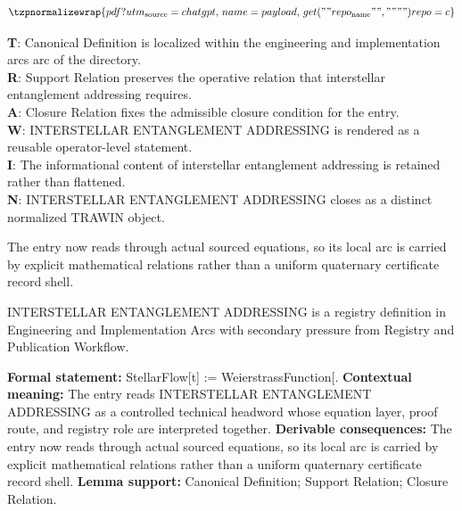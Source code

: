 \begin{minipage}[t]{0.48\linewidth}
\[
\tzpnormalizewrap{pdf?utm_{\mathrm{source}}=chatgpt,\,name = payload,\,get(""repo_{\mathrm{name}}"", """") repo = c}
\]

\small
\textbf{T}: Canonical Definition is localized within the engineering and implementation arcs arc of the directory.\\
\textbf{R}: Support Relation preserves the operative relation that interstellar entanglement addressing requires.\\
\textbf{A}: Closure Relation fixes the admissible closure condition for the entry.\\
\textbf{W}: INTERSTELLAR ENTANGLEMENT ADDRESSING is rendered as a reusable operator-level statement.\\
\textbf{I}: The informational content of interstellar entanglement addressing is retained rather than flattened.\\
\textbf{N}: INTERSTELLAR ENTANGLEMENT ADDRESSING closes as a distinct normalized TRAWIN object.
\normalsize
\end{minipage}

The entry now reads through actual sourced equations, so its local arc is carried by explicit mathematical relations rather than a uniform quaternary certificate record shell.
\clearpage


\begingroup\small
{}
INTERSTELLAR ENTANGLEMENT ADDRESSING is a registry definition in Engineering and Implementation Arcs with secondary pressure from Registry and Publication Workflow.

\begingroup\footnotesize\setlength{\emergencystretch}{3em}\sloppy
\textbf{Formal statement:} StellarFlow[t] := WeierstrassFunction[. \textbf{Contextual meaning:} The entry reads INTERSTELLAR ENTANGLEMENT ADDRESSING as a controlled technical headword whose equation layer, proof route, and registry role are interpreted together. \textbf{Derivable consequences:} The entry now reads through actual sourced equations, so its local arc is carried by explicit mathematical relations rather than a uniform quaternary certificate record shell. \textbf{Lemma support:} Canonical Definition; Support Relation; Closure Relation.\par
\endgroup

